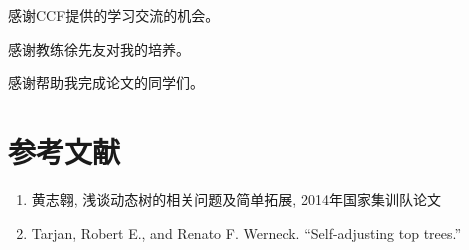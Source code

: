 \documentclass{noithesis}
\begin{document}
感谢CCF提供的学习交流的机会。

感谢教练徐先友对我的培养。

感谢帮助我完成论文的同学们。


\section*{参考文献}
\begin{enumerate}[\lbrack 1\rbrack]
\item \label{hza} 黄志翱, 浅谈动态树的相关问题及简单拓展, 2014年国家集训队论文
\item \label{tarjan_toptree} Tarjan, Robert E., and Renato F. Werneck. ``Self-adjusting top trees.''
\end{enumerate}





















\end{document}
